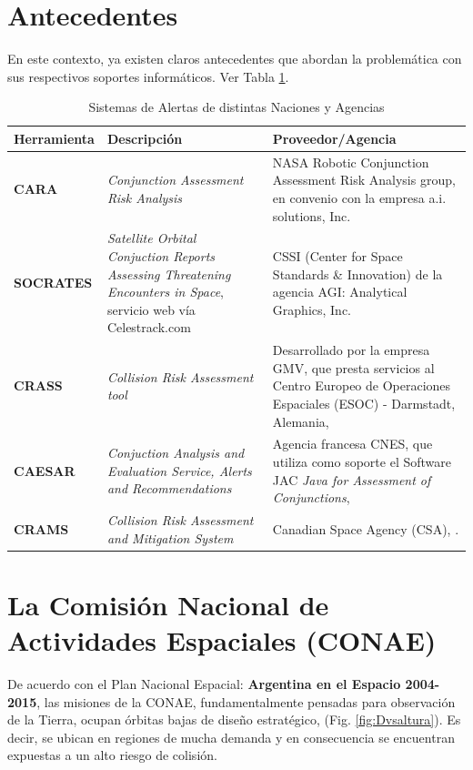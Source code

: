 \section{Antecedentes}\label{sec:antecedentes}
En este contexto, ya existen claros antecedentes que abordan la problem\'atica con sus respectivos soportes inform\'aticos. Ver Tabla \ref{tab:sisal}.
\begin{table}[!h]
\caption[Sistemas de Alerta]{Sistemas de Alertas de distintas Naciones y Agencias}
\begin{tabular}{lp{5cm}p{6cm}}
\hline
Herramienta & Descripci\'on & Proveedor/Agencia\\
\hline
{\bf{CARA}} & {\it{Conjunction Assessment Risk Analysis}} & NASA Robotic Conjunction Assessment Risk Analysis group, en convenio con la empresa a.i. solutions, Inc.\\
\hline
{\bf{SOCRATES}} & {\it{Satellite Orbital Conjuction Reports Assessing Threatening Encounters in Space}}, servicio web v\'ia Celestrack.com & CSSI (Center for Space Standards \& Innovation) de la agencia AGI: Analytical Graphics, Inc.\\
\hline
{\bf{CRASS}} & {\it{Collision Risk Assessment tool}} & Desarrollado por la
empresa GMV, que presta servicios al Centro Europeo de Operaciones
Espaciales (ESOC) - Darmstadt, Alemania, \citep{alarconRodriguez}\\
\hline
{\bf{CAESAR}} & {\it{Conjuction Analysis and Evaluation Service, Alerts and Recommendations}} & Agencia francesa CNES, que utiliza como soporte el Software JAC {\it{Java for Assessment of Conjunctions}}, \citep{laporte}\\
\hline
{\bf{CRAMS}} & {\it{Collision Risk Assessment and Mitigation System}} & Canadian Space Agency (CSA), \citep{babiker}.\\
\hline
\end{tabular}
\label{tab:sisal}
\end{table}

\section{La Comisi\'on Nacional de Actividades Espaciales (CONAE)}
De acuerdo con el Plan Nacional Espacial: {\bf{ Argentina en el Espacio 2004-2015}}, las misiones de la CONAE, fundamentalmente pensadas para observaci\'on de la Tierra, ocupan \'orbitas bajas de dise\~no estrat\'egico, (Fig. \ref{fig:Dvsaltura}). Es decir, se ubican en regiones de mucha demanda y en consecuencia se encuentran expuestas a un alto riesgo de colisi\'on.\\

